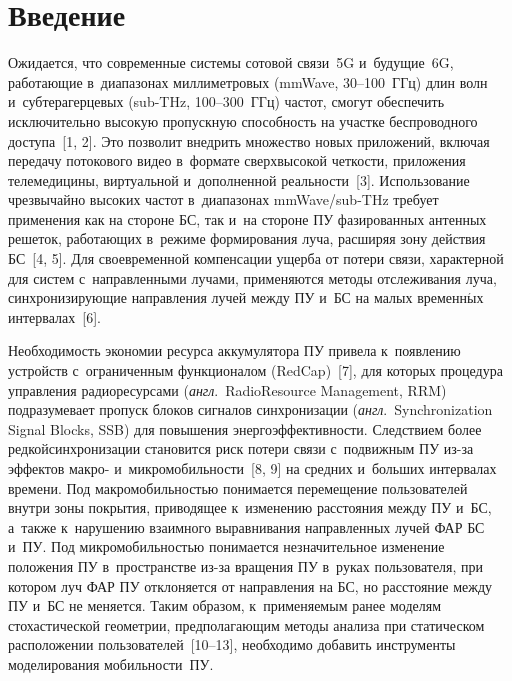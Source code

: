 \begin{multicols}{2}

\label{st\stat}

\section{Введение}

  Ожидается, что современные системы сотовой связи~5G и~будущие~6G, 
работающие в~диапазонах миллиметровых (mmWave, 30--100~ГГц) длин волн 
и~субтерагерцевых (sub-THz, 100--300~ГГц) час\-тот, смогут обеспечить 
исключительно высокую пропускную способность на участке беспроводного 
доступа~[1, 2]. Это позволит внедрить множество новых приложений, включая 
передачу потокового видео в~формате сверхвысокой четкости, приложения 
телемедицины, виртуальной и~дополненной реальности~[3]. Использование 
чрезвычайно высоких частот в~диапазонах mmWave/sub-THz требует применения 
как на стороне БС, так и~на стороне ПУ фазированных антенных решеток, ра\-бо\-та\-ющих в~режиме 
формирования луча, расширяя зону действия БС~[4, 5]. Для своевременной 
компенсации ущерба от потери связи, характерной для сис\-тем с~направленными 
лучами, применяются методы отслеживания луча, синхронизирующие 
направления лучей между ПУ и~БС на малых временн$\acute{\mbox{ы}}$х интервалах~[6]. 
  
  Необходимость экономии ресурса аккумулятора ПУ привела к~появлению 
устройств с~ограниченным функционалом (RedCap)~[7], для которых процедура управления радиоресурсами (\textit{англ}.\ 
Radio\linebreak Resource Management, RRM) подразумевает пропуск блоков сигналов 
синхронизации (\textit{англ}.\ Synchronization Signal Blocks, SSB) для повышения 
энергоэффективности. Следствием более редкой\linebreak синхронизации становится риск 
потери связи с~подвижным ПУ из-за эффектов макро- и~микромобильности~[8, 9] 
на средних и~больших интервалах времени. Под макромобильностью \mbox{понимается} 
перемещение пользователей внут\-ри зоны покрытия, приводящее к~изменению 
расстояния между ПУ и~БС, а~также к~нарушению взаимного выравнивания 
направленных лучей ФАР БС и~ПУ. Под микромобильностью понимается 
незначительное изменение положения ПУ в~пространстве из-за вращения ПУ 
в~руках пользователя, при котором луч ФАР ПУ отклоняется от направления на 
БС, но расстояние между ПУ и~БС не меняется. Таким образом, к~применяемым 
ранее моделям стохастической геометрии, предполагающим методы анализа при 
статическом расположении пользователей~[10--13], необходимо добавить 
инструменты моделирования мо\-биль\-ности~ПУ.
{

}
\end{multicols}
